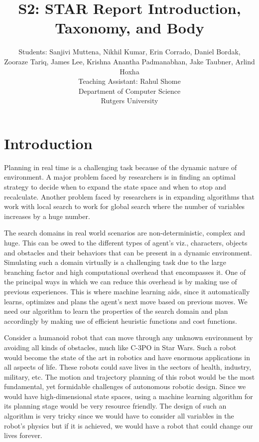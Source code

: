 \documentclass[tog]{acmsiggraph}
\title{S2: STAR Report Introduction, Taxonomy, and Body}
\author{Students: %
 Sanjivi Muttena\emailfoot{sanjivi.muttena@rutgers.edu}, %
 Nikhil Kumar\emailfoot{nikhilkumar516@gmail.com}, %
 Erin Corrado\emailfoot{e.corrado144@gmail.com}, %
 Daniel Bordak\emailfoot{dbordak@fastmail.fm},%
 \\Zooraze Tariq\emailfoot{zooraze@gmail.com}, %
 James Lee\emailfoot{yl50@scarletmail.rutgers.edu}, %
 Krishna Anantha Padmanabhan\emailfoot{krishna.ananth@rutgers.edu}, %
 Jake Taubner\emailfoot{jdt97@scarletmail.rutgers.edu}, %
 Arlind Hoxha\emailfoot{ah621@scarletmail.rutgers.edu}%
 \\Teaching Assistant: Rahul Shome\emailfoot{rahulshome.in@gmail.com}%
 \\Department of Computer Science%
 \\Rutgers University}
\begin{document}
\maketitle



\keywordlist
\setlength{\parskip}{0pt}
\setlength{\parindent}{10pt}

\section{Introduction}

Planning in real time is a challenging task because of the dynamic
nature of environment. A major problem faced by researchers is in
finding an optimal strategy to decide when to expand the state space
and when to stop and recalculate. Another problem faced by researchers
is in expanding algorithms that work with local search to work for
global search where the number of variables increases by a huge
number.

The search domains in real world scenarios are non-deterministic,
complex and huge. This can be owed to the different types of agent’s
viz., characters, objects and obstacles and their behaviors that can
be present in a dynamic environment. Simulating such a domain
virtually is a challenging task due to the large branching factor and
high computational overhead that encompasses it. One of the principal
ways in which we can reduce this overhead is by making use of previous
experiences. This is where machine learning aids, since it
automatically learns, optimizes and plans the agent’s next move based
on previous moves. We need our algorithm to learn the properties of
the search domain and plan accordingly by making use of efficient
heuristic functions and cost functions.

Consider a humanoid robot that can move through any unknown
environment by avoiding all kinds of obstacles, much like C-3PO in
Star Wars. Such a robot would become the state of the art in robotics
and have enormous applications in all aspects of life. These robots
could save lives in the sectors of health, industry, military, etc.
The motion and trajectory planning of this robot would be the most
fundamental, yet formidable challenges of autonomous robotic design.
Since we would have high-dimensional state spaces, using a machine
learning algorithm for its planning stage would be very resource
friendly. The design of such an algorithm is very tricky since we
would have to consider all variables in the robot’s physics but if it
is achieved, we would have a robot that could change our lives
forever.
\end{document}
